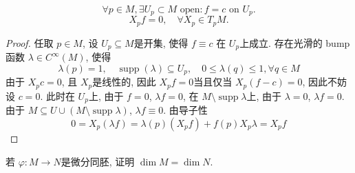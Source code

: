 \documentclass[../main.tex]{subfiles}
\begin{document}
\begin{exercise}{}{}
    \[
\forall p \in M, \exists U_p \subset M \text{ open}: f=c \text{ on } U_p.
\]
\[
X_p f = 0, \quad \forall X_p \in T_p M.
\]
\end{exercise}
\begin{proof}
    任取 \(  p \in M  \), 设 \(  U_{p}\subseteq M  \)是开集, 使得 \(  f\equiv c  \) 在 \(  U_{p}  \)上成立. 存在光滑的 bump函数 \(   \lambda \in C^{\infty}\left( M \right)   \), 使得 \[
     \lambda \left( p \right)= 1,\quad \operatorname{supp}\left(  \lambda  \right)\subseteq U_{p}, \quad 0\le  \lambda \left( q \right)\le 1,\forall q\in M   
    \]   由于 \(  X_{p}c= 0  \), 且 \(  X_{p}  \)是线性的, 因此 \(  X_{p}f= 0  \)当且仅当 \(  X_{p}\left( f-c \right)= 0   \), 因此不妨设 \(  c= 0  \).  此时在 \(  U_{p}  \)上, 由于 \(  f= 0  \), \(   \lambda f= 0  \), 在       \(  M\setminus \operatorname{supp} \lambda   \)上, 由于 \(   \lambda = 0  \), \(   \lambda f= 0  \).   由于 \(  M\subseteq U\cup \left( M\setminus \operatorname{supp} \lambda  \right)   \),  \(   \lambda f  \equiv 0\). 由导子性 \[
    0= X_{p}\left(  \lambda f \right)=  \lambda \left( p \right)\left( X_{p}f \right)+ f\left( p \right) X_{p} \lambda = X_{p}f      
    \]  
\end{proof}
\begin{exercise}{}{}
    若 \(   \varphi :M\to N  \)是微分同胚, 证明 \(  \operatorname{dim}M= \operatorname{dim}N  \).  
\end{exercise}
\end{document}
